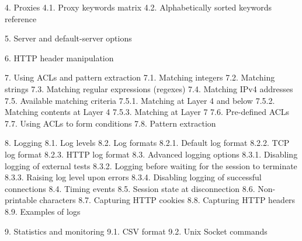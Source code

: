 4.    Proxies
4.1.      Proxy keywords matrix
4.2.      Alphabetically sorted keywords reference


5.    Server and default-server options


6.    HTTP header manipulation


7.    Using ACLs and pattern extraction
7.1.      Matching integers
7.2.      Matching strings
7.3.      Matching regular expressions (regexes)
7.4.      Matching IPv4 addresses
7.5.      Available matching criteria
7.5.1.        Matching at Layer 4 and below
7.5.2.        Matching contents at Layer 4
7.5.3.        Matching at Layer 7
7.6.      Pre-defined ACLs
7.7.      Using ACLs to form conditions
7.8.      Pattern extraction


8.    Logging
8.1.      Log levels
8.2.      Log formats
8.2.1.        Default log format
8.2.2.        TCP log format
8.2.3.        HTTP log format
8.3.      Advanced logging options
8.3.1.        Disabling logging of external tests
8.3.2.        Logging before waiting for the session to terminate
8.3.3.        Raising log level upon errors
8.3.4.        Disabling logging of successful connections
8.4.      Timing events
8.5.      Session state at disconnection
8.6.      Non-printable characters
8.7.      Capturing HTTP cookies
8.8.      Capturing HTTP headers
8.9.      Examples of logs


9.    Statistics and monitoring
9.1.      CSV format
9.2.      Unix Socket commands

